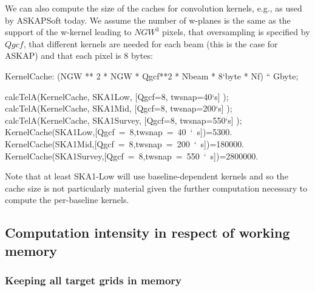 \documentclass[useAMS,usenatbib,referee]{article}
\begin{document}
We can also compute the size of the caches for convolution kernels,
e.g., as used by ASKAPSoft today. We assume the number of w-planes is
the same as the support of the w-kernel leading to $NGW^3$ pixels,
that oversampling is specified by $Qgcf$, that different kernels are
needed for each beam (this is the case for ASKAP) and that each pixel
is 8 bytes:
\begin{maxima}[]
KernelCache: (NGW ** 2 * NGW * Qgcf**2 * Nbeam * 8`byte * Nf) `` Gbyte;

calcTelA(KernelCache, SKA1Low,  [Qgcf=8, twsnap=40`s] );
calcTelA(KernelCache, SKA1Mid,  [Qgcf=8, twsnap=200`s] );
calcTelA(KernelCache, SKA1Survey,  [Qgcf=8, twsnap=550`s] );
\maximaoutput*
{}\; \\
\m  \mbox{{}KernelCache(SKA1Low,[Qgcf = 8,twsnap = 40 ` s]){}}=5300. \\
\m  \mbox{{}KernelCache(SKA1Mid,[Qgcf = 8,twsnap = 200 ` s]){}}=180000. \\
\m  \mbox{{}KernelCache(SKA1Survey,[Qgcf = 8,twsnap = 550 ` s]){}}=2800000. \\
\end{maxima}
Note that at least SKA1-Low will use baseline-dependent kernels and so
the cache size is not particularly material given the further
computation necessary to compute the per-baseline kernels.

\subsection{Computation intensity in respect of working memory}

\subsubsection{Keeping all target grids in memory}
\end{document}

